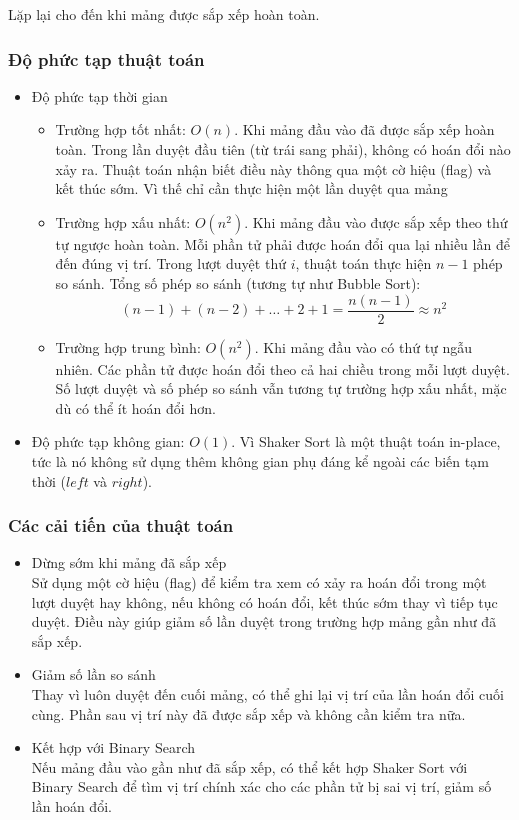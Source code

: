 Lặp lại cho đến khi mảng được sắp xếp hoàn toàn.

\subsubsection{Độ phức tạp thuật toán}

\begin{itemize}
	\item Độ phức tạp thời gian
	\begin{itemize}[label=$\circ$]
		\item Trường hợp tốt nhất: $O\left(n\right)$. Khi mảng đầu vào đã được sắp xếp hoàn toàn. Trong lần duyệt đầu tiên (từ trái sang phải), không có hoán đổi nào xảy ra. Thuật toán nhận biết điều này thông qua một cờ hiệu (flag) và kết thúc sớm. Vì thế chỉ cần thực hiện một lần duyệt qua mảng
		\item Trường hợp xấu nhất: $O\left(n^2\right)$. Khi mảng đầu vào được sắp xếp theo thứ tự ngược hoàn toàn. Mỗi phần tử phải được hoán đổi qua lại nhiều lần để đến đúng vị trí. Trong lượt duyệt thứ $i$, thuật toán thực hiện $n - 1$ phép so sánh.
		Tổng số phép so sánh (tương tự như Bubble Sort): 
		\begin{equation*}
			\left(n-1\right)+\left(n-2\right)+\ldots+2+1=\frac{n\left(n-1\right)}{2}\approx n^2
		\end{equation*}
		\item Trường hợp trung bình: $O\left(n^2\right)$. Khi mảng đầu vào có thứ tự ngẫu nhiên. Các phần tử được hoán đổi theo cả hai chiều trong mỗi lượt duyệt. Số lượt duyệt và số phép so sánh vẫn tương tự trường hợp xấu nhất, mặc dù có thể ít hoán đổi hơn.
	\end{itemize}
	\item Độ phức tạp không gian: $O(1)$. Vì Shaker Sort là một thuật toán in-place, tức là nó không sử dụng thêm không gian phụ đáng kể ngoài các biến tạm thời ($left$ và $right$).  
\end{itemize}

\subsubsection{Các cải tiến của thuật toán}

\begin{itemize}
	\item Dừng sớm khi mảng đã sắp xếp \\
	Sử dụng một cờ hiệu (flag) để kiểm tra xem có xảy ra hoán đổi trong một lượt duyệt hay không, nếu không có hoán đổi, kết thúc sớm thay vì tiếp tục duyệt. Điều này giúp giảm số lần duyệt trong trường hợp mảng gần như đã sắp xếp.
	\item Giảm số lần so sánh \\
	Thay vì luôn duyệt đến cuối mảng, có thể ghi lại vị trí của lần hoán đổi cuối cùng. Phần sau vị trí này đã được sắp xếp và không cần kiểm tra nữa.
	\item Kết hợp với Binary Search \\
	Nếu mảng đầu vào gần như đã sắp xếp, có thể kết hợp Shaker Sort với Binary Search để tìm vị trí chính xác cho các phần tử bị sai vị trí, giảm số lần hoán đổi.
\end{itemize}